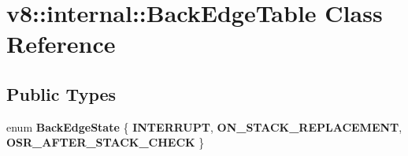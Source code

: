 \hypertarget{classv8_1_1internal_1_1_back_edge_table}{}\section{v8\+:\+:internal\+:\+:Back\+Edge\+Table Class Reference}
\label{classv8_1_1internal_1_1_back_edge_table}
\subsection*{Public Types}
\begin{DoxyCompactItemize}
\item 
\hypertarget{classv8_1_1internal_1_1_back_edge_table_a5fdd294b989ae7d9c3c08deecd60efa2}{}enum {\bfseries Back\+Edge\+State} \{ {\bfseries I\+N\+T\+E\+R\+R\+U\+P\+T}, 
{\bfseries O\+N\+\_\+\+S\+T\+A\+C\+K\+\_\+\+R\+E\+P\+L\+A\+C\+E\+M\+E\+N\+T}, 
{\bfseries O\+S\+R\+\_\+\+A\+F\+T\+E\+R\+\_\+\+S\+T\+A\+C\+K\+\_\+\+C\+H\+E\+C\+K}
 \}\label{classv8_1_1internal_1_1_back_edge_table_a5fdd294b989ae7d9c3c08deecd60efa2}

\end{DoxyCompactItemize}
